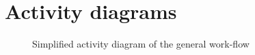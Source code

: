 \documentclass[a4paper]{article}
\begin{document}
\appendix

\newpage\section{Activity diagrams}\label{app:ad}

\begin{figure}[ht]
  \caption{Simplified activity diagram of the general work-flow}
  \centering
  \label{fig:app:ad_generalworkflow}
\end{figure}
\end{document}
